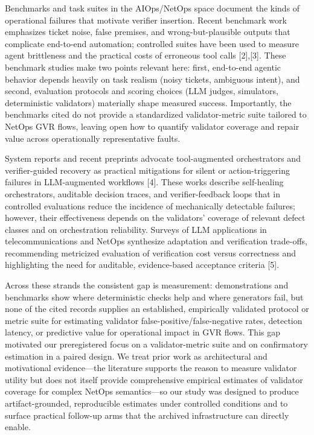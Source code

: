 \documentclass[conference]{IEEEtran}
\begin{document}
Benchmarks and task suites in the AIOps/NetOps space document the kinds of operational failures that motivate verifier insertion. Recent benchmark work emphasizes ticket noise, false premises, and wrong-but-plausible outputs that complicate end-to-end automation; controlled suites have been used to measure agent brittleness and the practical costs of erroneous tool calls [2],[3]. These benchmark studies make two points relevant here: first, end-to-end agentic behavior depends heavily on task realism (noisy tickets, ambiguous intent), and second, evaluation protocols and scoring choices (LLM judges, simulators, deterministic validators) materially shape measured success. Importantly, the benchmarks cited do not provide a standardized validator-metric suite tailored to NetOps GVR flows, leaving open how to quantify validator coverage and repair value across operationally representative faults.

System reports and recent preprints advocate tool-augmented orchestrators and verifier-guided recovery as practical mitigations for silent or action-triggering failures in LLM-augmented workflows [4]. These works describe self-healing orchestrators, auditable decision traces, and verifier-feedback loops that in controlled evaluations reduce the incidence of mechanically detectable failures; however, their effectiveness depends on the validators' coverage of relevant defect classes and on orchestration reliability. Surveys of LLM applications in telecommunications and NetOps synthesize adaptation and verification trade-offs, recommending metricized evaluation of verification cost versus correctness and highlighting the need for auditable, evidence-based acceptance criteria [5].

Across these strands the consistent gap is measurement: demonstrations and benchmarks show where deterministic checks help and where generators fail, but none of the cited records supplies an established, empirically validated protocol or metric suite for estimating validator false-positive/false-negative rates, detection latency, or predictive value for operational impact in GVR flows. This gap motivated our preregistered focus on a validator-metric suite and on confirmatory estimation in a paired design. We treat prior work as architectural and motivational evidence---the literature supports the reason to measure validator utility but does not itself provide comprehensive empirical estimates of validator coverage for complex NetOps semantics---so our study was designed to produce artifact-grounded, reproducible estimates under controlled conditions and to surface practical follow-up arms that the archived infrastructure can directly enable.
\end{document}
